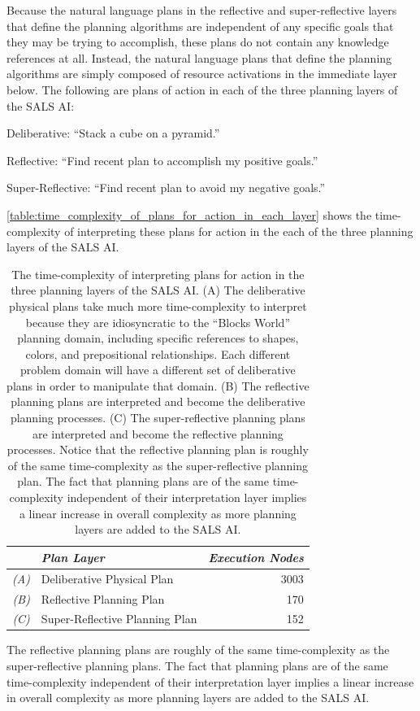 Because the natural language plans in the reflective and
super-reflective layers that define the planning algorithms are
independent of any specific goals that they may be trying to
accomplish, these plans do not contain any knowledge references at
all.  Instead, the natural language plans that define the planning
algorithms are simply composed of resource activations in the
immediate layer below.  The following are plans of action in each of
the three planning layers of the SALS AI:
\begin{packed_enumerate}
\item{Deliberative: ``Stack a cube on a pyramid.''}
\item{Reflective: ``Find recent plan to accomplish my positive
  goals.''}
\item{Super-Reflective: ``Find recent plan to avoid my negative
  goals.''}
\end{packed_enumerate}
{\mbox{\autoref{table:time_complexity_of_plans_for_action_in_each_layer}}}
shows the time-complexity of interpreting these plans for action in
the each of the three planning layers of the SALS AI.
\begin{table}
\centering
\begin{tabular}{|r l|r|}
\hline
           &\emph{Plan Layer}              &\emph{Execution Nodes} \\
\hline
\emph{(A)} &Deliberative Physical Plan     & 3003                  \\
\hline
\emph{(B)} &Reflective Planning Plan       & 170                   \\
\hline
\emph{(C)} &Super-Reflective Planning Plan & 152                   \\
\hline
\end{tabular}
\caption[The time-complexity of interpreting plans for action in the
  three planning layers in the SALS AI.]{The time-complexity of
  interpreting plans for action in the three planning layers of the
  SALS AI.  (A) The deliberative physical plans take much more
  time-complexity to interpret because they are idiosyncratic to the
  ``Blocks World'' planning domain, including specific references to
  shapes, colors, and prepositional relationships.  Each different
  problem domain will have a different set of deliberative plans in
  order to manipulate that domain.  (B) The reflective planning plans
  are interpreted and become the deliberative planning processes.  (C)
  The super-reflective planning plans are interpreted and become the
  reflective planning processes.  Notice that the reflective planning
  plan is roughly of the same time-complexity as the super-reflective
  planning plan.  The fact that planning plans are of the same
  time-complexity independent of their interpretation layer implies a
  linear increase in overall complexity as more planning layers are
  added to the SALS AI.}
\label{table:time_complexity_of_plans_for_action_in_each_layer}
\end{table}
The reflective planning plans are roughly of the same time-complexity
as the super-reflective planning plans.  The fact that planning plans
are of the same time-complexity independent of their interpretation
layer implies a linear increase in overall complexity as more planning
layers are added to the SALS AI.

